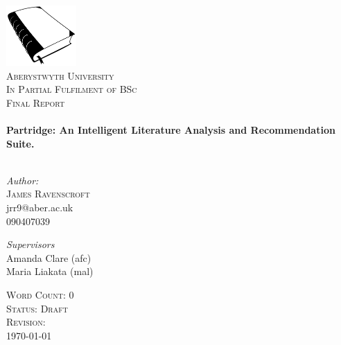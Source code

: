 \begin{titlepage}
 
\begin{center}

\includegraphics[width=0.20\textwidth]{../cover_logo.png}\\[1cm]


\textsc{\LARGE Aberystwyth University}\\[0.5cm]
\textsc{\LARGE In Partial Fulfilment of BSc}\\
\textsc{\LARGE Final Report}\\[0.5cm]


 
\HRule \\[0.4cm]
{ \huge \bfseries Partridge: An Intelligent Literature Analysis and
Recommendation Suite.}\\[0.4cm]

\HRule \\[1.5cm]

\begin{minipage}{0.4\textwidth}
\begin{flushleft} \large
\emph{Author:}\\
\textsc{James Ravenscroft}\\
jrr9@aber.ac.uk\\
090407039\\
\end{flushleft}
\end{minipage}
\begin{minipage}{0.4\textwidth}
\begin{flushright} \large
\emph{Supervisors} \\
Amanda Clare (afc)\\
Maria Liakata (mal)

\end{flushright}
\end{minipage}

\vfill
 
\textsc{\large Word Count: 0}\\
\textsc{\large Status: Draft}\\
\textsc{\large Revision: \Revision{} }\\
{\large \today}
 
\end{center}
 
\end{titlepage}

